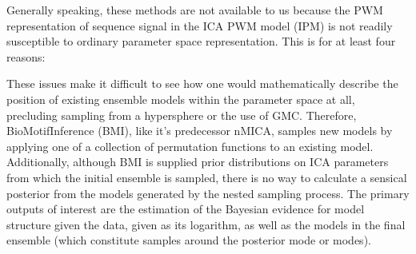 Generally speaking, these methods are not available to us because the PWM representation of sequence signal in the ICA PWM model (IPM) is not readily susceptible to ordinary parameter space representation. This is for at least four reasons:


These issues make it difficult to see how one would mathematically describe the position of existing ensemble models within the parameter space at all, precluding sampling from a hypersphere or the use of GMC. Therefore, BioMotifInference (BMI), like it's predecessor nMICA, samples new models by applying one of a collection of permutation functions to an existing model. Additionally, although BMI is supplied prior distributions on ICA parameters from which the initial ensemble is sampled, there is no way to calculate a sensical posterior from the models generated by the nested sampling process. The primary outputs of interest are the estimation of the Bayesian evidence for model structure given the data, given as its logarithm, as well as the models in the final ensemble (which constitute samples around the posterior mode or modes).

